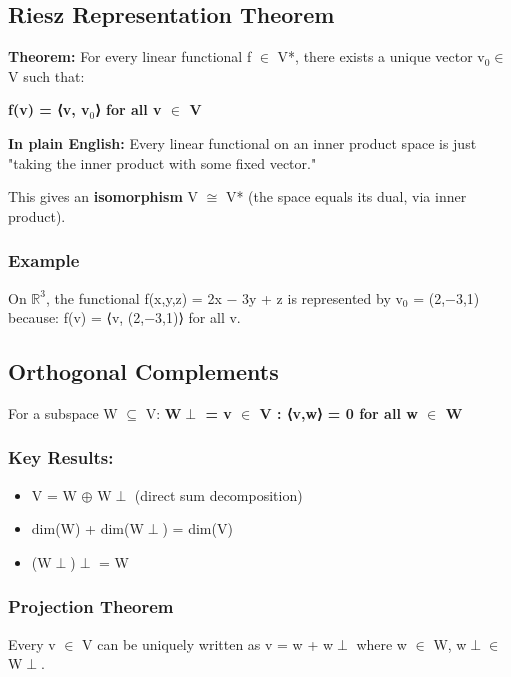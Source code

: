 \documentclass[12pt,a4paper,openany]{book}
\begin{document}
{{\subsection{Riesz Representation Theorem}

\begin{tcolorbox}[colback=lightblue,colframe=thmblue,title=\textbf{Theorem},breakable,boxrule=1.5pt]
\textbf{Theorem:} For every linear functional f $\in$ V*, there exists a unique vector v$_0\in$ V such that:
\end{tcolorbox}

\textbf{f(v) = ⟨v, v$_0$⟩ for all v $\in$ V}

\textbf{In plain English:} Every linear functional on an inner product space is just "taking the inner product with some fixed vector."

This gives an \textbf{isomorphism} V $\cong$ V* (the space equals its dual, via inner product).

\subsubsection{Example}
On $\mathbb{R}^3$, the functional f(x,y,z) = 2x − 3y + z is represented by v$_0$ = (2,−3,1) because:
f(v) = ⟨v, (2,−3,1)⟩ for all v.

\subsection{Orthogonal Complements}

For a subspace W $\subseteq$ V: \textbf{W$\perp$ = {v $\in$ V : ⟨v,w⟩ = 0 for all w $\in$ W}}

\subsubsection{Key Results:}
\begin{itemize}[leftmargin=*]
  \item V = W $\oplus$ W$\perp$ (direct sum decomposition)
  \item dim(W) + dim(W$\perp$) = dim(V)
  \item (W$\perp$)$\perp$ = W
\end{itemize}

\subsubsection{Projection Theorem}
Every v $\in$ V can be uniquely written as v = w + w$\perp$ where w $\in$ W, w$\perp\in$ W$\perp$.

}}
\end{document}
